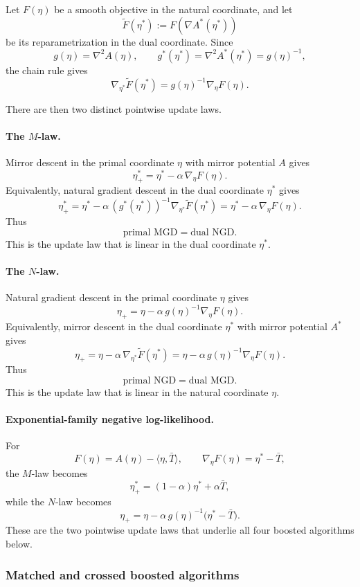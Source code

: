 \documentclass[11pt]{article}
\begin{document}
Let \(F(\eta)\) be a smooth objective in the natural coordinate, and let
\[
\widetilde F(\eta^\ast):=F(\nabla A^\ast(\eta^\ast))
\]
be its reparametrization in the dual coordinate. Since
\[
g(\eta)=\nabla^2 A(\eta),
\qquad
g^\ast(\eta^\ast)=\nabla^2 A^\ast(\eta^\ast)=g(\eta)^{-1},
\]
the chain rule gives
\[
\nabla_{\eta^\ast}\widetilde F(\eta^\ast)=g(\eta)^{-1}\nabla_\eta F(\eta).
\]

There are then two distinct pointwise update laws.

\paragraph{The \(M\)-law.}
Mirror descent in the primal coordinate \(\eta\) with mirror potential \(A\) gives
\[
\eta^\ast_{+}
=
\eta^\ast-\alpha\,\nabla_\eta F(\eta).
\]
Equivalently, natural gradient descent in the dual coordinate \(\eta^\ast\) gives
\[
\eta^\ast_{+}
=
\eta^\ast-\alpha\,(g^\ast(\eta^\ast))^{-1}\nabla_{\eta^\ast}\widetilde F(\eta^\ast)
=
\eta^\ast-\alpha\,\nabla_\eta F(\eta).
\]
Thus
\[
\boxed{\text{primal MGD}=\text{dual NGD}.}
\]
This is the update law that is linear in the dual coordinate \(\eta^\ast\).

\paragraph{The \(N\)-law.}
Natural gradient descent in the primal coordinate \(\eta\) gives
\[
\eta_{+}
=
\eta-\alpha\,g(\eta)^{-1}\nabla_\eta F(\eta).
\]
Equivalently, mirror descent in the dual coordinate \(\eta^\ast\) with mirror potential \(A^\ast\) gives
\[
\eta_{+}
=
\eta-\alpha\,\nabla_{\eta^\ast}\widetilde F(\eta^\ast)
=
\eta-\alpha\,g(\eta)^{-1}\nabla_\eta F(\eta).
\]
Thus
\[
\boxed{\text{primal NGD}=\text{dual MGD}.}
\]
This is the update law that is linear in the natural coordinate \(\eta\).

\paragraph{Exponential-family negative log-likelihood.}
For
\[
F(\eta)=A(\eta)-\langle \eta,\bar T\rangle,
\qquad
\nabla_\eta F(\eta)=\eta^\ast-\bar T,
\]
the \(M\)-law becomes
\[
\eta^\ast_{+}=(1-\alpha)\eta^\ast+\alpha \bar T,
\]
while the \(N\)-law becomes
\[
\eta_{+}
=
\eta-\alpha\,g(\eta)^{-1}\bigl(\eta^\ast-\bar T\bigr).
\]
These are the two pointwise update laws that underlie all four boosted algorithms below.

\subsubsection{Matched and crossed boosted algorithms}
\end{document}
